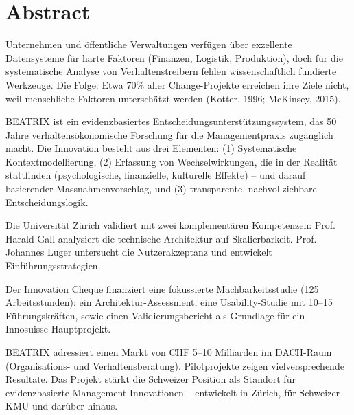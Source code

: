\documentclass[11pt,a4paper]{article}
\begin{document}

\tableofcontents
\newpage


\section*{Abstract}

Unternehmen und öffentliche Verwaltungen verfügen über exzellente Datensysteme für harte Faktoren (Finanzen, Logistik, Produktion), doch für die systematische Analyse von Verhaltenstreibern fehlen wissenschaftlich fundierte Werkzeuge. Die Folge: Etwa 70\% aller Change-Projekte erreichen ihre Ziele nicht, weil menschliche Faktoren unterschätzt werden (Kotter, 1996; McKinsey, 2015).

BEATRIX ist ein evidenzbasiertes Entscheidungsunterstützungssystem, das 50 Jahre verhaltensökonomische Forschung für die Managementpraxis zugänglich macht. Die Innovation besteht aus drei Elementen: (1) Systematische Kontextmodellierung, (2) Erfassung von Wechselwirkungen, die in der Realität stattfinden (psychologische, finanzielle, kulturelle Effekte) -- und darauf basierender Massnahmenvorschlag, und (3) transparente, nachvollziehbare Entscheidungslogik.

Die Universität Zürich validiert mit zwei komplementären Kompetenzen: Prof. Harald Gall analysiert die technische Architektur auf Skalierbarkeit. Prof. Johannes Luger untersucht die Nutzerakzeptanz und entwickelt Einführungsstrategien.

Der Innovation Cheque finanziert eine fokussierte Machbarkeitsstudie (125 Arbeitsstunden): ein Architektur-Assessment, eine Usability-Studie mit 10--15 Führungskräften, sowie einen Validierungsbericht als Grundlage für ein Innosuisse-Hauptprojekt.

BEATRIX adressiert einen Markt von CHF 5--10 Milliarden im DACH-Raum (Organisations- und Verhaltensberatung). Pilotprojekte zeigen vielversprechende Resultate. Das Projekt stärkt die Schweizer Position als Standort für evidenzbasierte Management-Innovationen -- entwickelt in Zürich, für Schweizer KMU und darüber hinaus.
\end{document}
